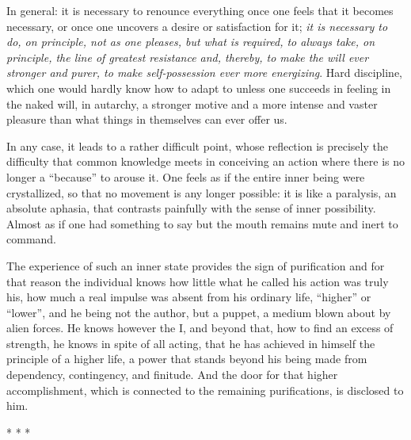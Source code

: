 In general: it is necessary to renounce everything once one feels that it becomes necessary, or once one uncovers a desire or satisfaction for it; \textit{it is necessary to do, on principle, not as one pleases, but what is required, to always take, on principle, the line of greatest resistance and, thereby, to make the will ever stronger and purer, to make self-possession ever more energizing}. Hard discipline, which one would hardly know how to adapt to unless one succeeds in feeling in the naked will, in autarchy, a stronger motive and a more intense and vaster pleasure than what things in themselves can ever offer us.

In any case, it leads to a rather difficult point, whose reflection is precisely the difficulty that common knowledge meets in conceiving an action where there is no longer a “because” to arouse it. One feels as if the entire inner being were crystallized, so that no movement is any longer possible: it is like a paralysis, an absolute aphasia, that contrasts painfully with the sense of inner possibility. Almost as if one had something to say but the mouth remains mute and inert to command.

The experience of such an inner state provides the sign of purification and for that reason the individual knows how little what he called his action was truly his, how much a real impulse was absent from his ordinary life, “higher” or “lower”, and he being not the author, but a puppet, a medium blown about by alien forces. He knows however the I, and beyond that, how to find an excess of strength, he knows in spite of all acting, that he has achieved in himself the principle of a higher life, a power that stands beyond his being made from dependency, contingency, and finitude. And the door for that higher accomplishment, which is connected to the remaining purifications, is disclosed to him.




\begin{center}* * *\end{center}

